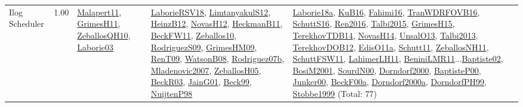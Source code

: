 {\begin{longtable}{p{3cm}r>{\raggedright\arraybackslash}p{6cm}>{\raggedright\arraybackslash}p{6cm}>{\raggedright\arraybackslash}p{8cm}}
\index{Ilog Scheduler}\index{CPSystems!Ilog Scheduler}Ilog Scheduler &  1.00 & \hyperref[detail:Malapert11]{Malapert11}, \hyperref[detail:GrimesH11]{GrimesH11}, \hyperref[detail:ZeballosQH10]{ZeballosQH10}, \hyperref[detail:Laborie03]{Laborie03} & \hyperref[detail:LaborieRSV18]{LaborieRSV18}, \hyperref[detail:LimtanyakulS12]{LimtanyakulS12}, \hyperref[detail:HeinzB12]{HeinzB12}, \hyperref[detail:NovasH12]{NovasH12}, \hyperref[detail:HeckmanB11]{HeckmanB11}, \hyperref[detail:BeckFW11]{BeckFW11}, \hyperref[detail:Zeballos10]{Zeballos10}, \hyperref[detail:RodriguezS09]{RodriguezS09}, \hyperref[detail:GrimesHM09]{GrimesHM09}, \hyperref[detail:RenT09]{RenT09}, \hyperref[detail:WatsonB08]{WatsonB08}, \hyperref[detail:Rodriguez07b]{Rodriguez07b}, \hyperref[detail:Mladenovic2007]{Mladenovic2007}, \hyperref[detail:ZeballosH05]{ZeballosH05}, \hyperref[detail:BeckR03]{BeckR03}, \hyperref[detail:JainG01]{JainG01}, \hyperref[detail:Beck99]{Beck99}, \hyperref[detail:NuijtenP98]{NuijtenP98} & \hyperref[detail:Laborie18a]{Laborie18a}, \hyperref[detail:KuB16]{KuB16}, \hyperref[detail:Fahimi16]{Fahimi16}, \hyperref[detail:TranWDRFOVB16]{TranWDRFOVB16}, \hyperref[detail:SchuttS16]{SchuttS16}, \hyperref[detail:Ren2016]{Ren2016}, \hyperref[detail:Talbi2015]{Talbi2015}, \hyperref[detail:GrimesH15]{GrimesH15}, \hyperref[detail:TerekhovTDB14]{TerekhovTDB14}, \hyperref[detail:NovasH14]{NovasH14}, \hyperref[detail:UnsalO13]{UnsalO13}, \hyperref[detail:Talbi2013]{Talbi2013}, \hyperref[detail:TerekhovDOB12]{TerekhovDOB12}, \hyperref[detail:EdisO11a]{EdisO11a}, \hyperref[detail:Schutt11]{Schutt11}, \hyperref[detail:ZeballosNH11]{ZeballosNH11}, \hyperref[detail:SchuttFSW11]{SchuttFSW11}, \hyperref[detail:LahimerLH11]{LahimerLH11}, \hyperref[detail:BeniniLMR11]{BeniniLMR11}...\hyperref[detail:Baptiste02]{Baptiste02}, \hyperref[detail:BosiM2001]{BosiM2001}, \hyperref[detail:SourdN00]{SourdN00}, \hyperref[detail:Dorndorf2000]{Dorndorf2000}, \hyperref[detail:BaptisteP00]{BaptisteP00}, \hyperref[detail:Junker00]{Junker00}, \hyperref[detail:BeckF00a]{BeckF00a}, \hyperref[detail:Dorndorf2000a]{Dorndorf2000a}, \hyperref[detail:DorndorfPH99]{DorndorfPH99}, \hyperref[detail:Stobbe1999]{Stobbe1999} (Total: 77)\\

\end{longtable}}
